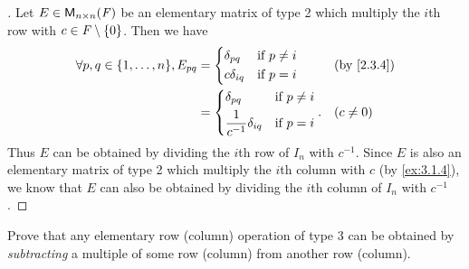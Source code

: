 \begin{proof}[]
  Let \(E \in \ms[n][n][\F]\) be an elementary matrix of type 2 which multiply the \(i\)th row with \(c \in \mathit{F} \setminus \left\lbrace0\right\rbrace\).
  Then we have
  \begin{align*}
    \forall p, q \in \set{1, \dots, n}, E_{p q} & = \begin{dcases}
                                                      \delta_{p q}   & \text{if } p \neq i \\
                                                      c \delta_{i q} & \text{if } p = i
                                                    \end{dcases}                                      &  & \by{2.3.4}           \\
                                                & = \begin{dcases}
                                                      \delta_{p q}                  & \text{if } p \neq i \\
                                                      \frac{1}{c^{-1}} \delta_{i q} & \text{if } p = i
                                                    \end{dcases}. &  & (c \neq 0)
  \end{align*}
  Thus \(E\) can be obtained by dividing the \(i\)th row of \(I_n\) with \(c^{-1}\).
  Since \(E\) is also an elementary matrix of type 2 which multiply the \(i\)th column with \(c\) (by \cref{ex:3.1.4}), we know that \(E\) can also be obtained by dividing the \(i\)th column of \(I_n\) with \(c^{-1}\).
\end{proof}

\begin{ex}\label{ex:3.1.11}
  Prove that any elementary row (column) operation of type 3 can be obtained by \emph{subtracting} a multiple of some row (column) from another row (column).
\end{ex}

